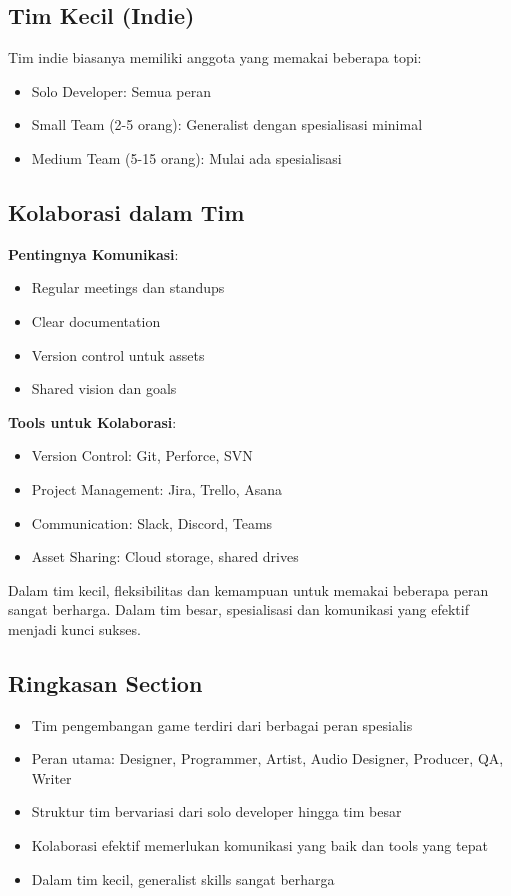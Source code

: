 \subsection{Tim Kecil (Indie)}

Tim indie biasanya memiliki anggota yang memakai beberapa topi:
\begin{itemize}
\item Solo Developer: Semua peran
\item Small Team (2-5 orang): Generalist dengan spesialisasi minimal
\item Medium Team (5-15 orang): Mulai ada spesialisasi
\end{itemize}

\subsection{Kolaborasi dalam Tim}

\textbf{Pentingnya Komunikasi}:
\begin{itemize}
\item Regular meetings dan standups
\item Clear documentation
\item Version control untuk assets
\item Shared vision dan goals
\end{itemize}

\textbf{Tools untuk Kolaborasi}:
\begin{itemize}
\item Version Control: Git, Perforce, SVN
\item Project Management: Jira, Trello, Asana
\item Communication: Slack, Discord, Teams
\item Asset Sharing: Cloud storage, shared drives
\end{itemize}

\begin{catatan}
Dalam tim kecil, fleksibilitas dan kemampuan untuk memakai beberapa peran sangat berharga. Dalam tim besar, spesialisasi dan komunikasi yang efektif menjadi kunci sukses.
\end{catatan}

\subsection{Ringkasan Section}

\begin{itemize}
\item Tim pengembangan game terdiri dari berbagai peran spesialis
\item Peran utama: Designer, Programmer, Artist, Audio Designer, Producer, QA, Writer
\item Struktur tim bervariasi dari solo developer hingga tim besar
\item Kolaborasi efektif memerlukan komunikasi yang baik dan tools yang tepat
\item Dalam tim kecil, generalist skills sangat berharga
\end{itemize}
